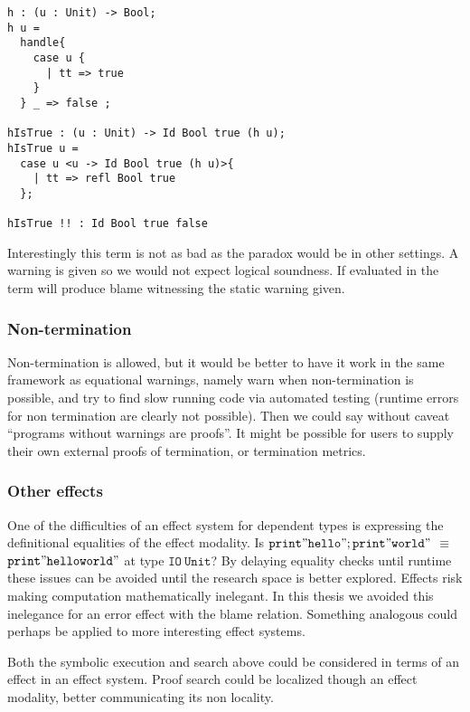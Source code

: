 \begin{lstlisting}
h : (u : Unit) -> Bool;
h u =
  handle{
    case u {
      | tt => true
    }
  } _ => false ;

hIsTrue : (u : Unit) -> Id Bool true (h u);
hIsTrue u =
  case u <u -> Id Bool true (h u)>{
    | tt => refl Bool true
  };

hIsTrue !! : Id Bool true false
\end{lstlisting}

Interestingly this term is not as bad as the paradox would be in other settings.
A warning is given so we would not expect logical soundness.
If evaluated in \whnf{} the term will produce blame witnessing the static warning given.


\subsubsection{Non-termination}

Non-termination is allowed, but it would be better to have it work in the same framework as equational warnings, namely warn when non-termination is possible, and try to find slow running code via automated testing (runtime errors for non termination are clearly not possible).
Then we could say without caveat ``programs without warnings are proofs''.
It might be possible for users to supply their own external proofs of termination\cite{casinghino2014combining}, or termination metrics.

\subsubsection{Other effects}

One of the difficulties of an effect system for dependent types is expressing the definitional equalities of the effect modality.
Is $\mathtt{print"hello";print"world"}$ $\equiv$ $\mathtt{print"helloworld"}$ at type $\mathtt{IO\ Unit}$?
By delaying equality checks until runtime these issues can be avoided until the research space is better explored.
Effects risk making computation mathematically inelegant.
In this thesis we avoided this inelegance for an error effect with the blame relation.
Something analogous could perhaps be applied to more interesting effect systems.

Both the symbolic execution and search above could be considered in terms of an effect in an effect system. 
Proof search could be localized though an effect modality, better communicating its non locality.

